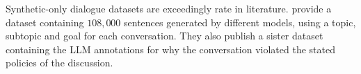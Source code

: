Synthetic-only dialogue datasets are exceedingly rate in literature. \cite{lambert2024selfdirectedsyntheticdialoguesrevisions} provide a dataset containing  $108,000$ sentences generated by different models, using a topic, subtopic and goal for each conversation. They also publish a sister dataset containing the LLM annotations for why the conversation violated the stated policies of the discussion.


